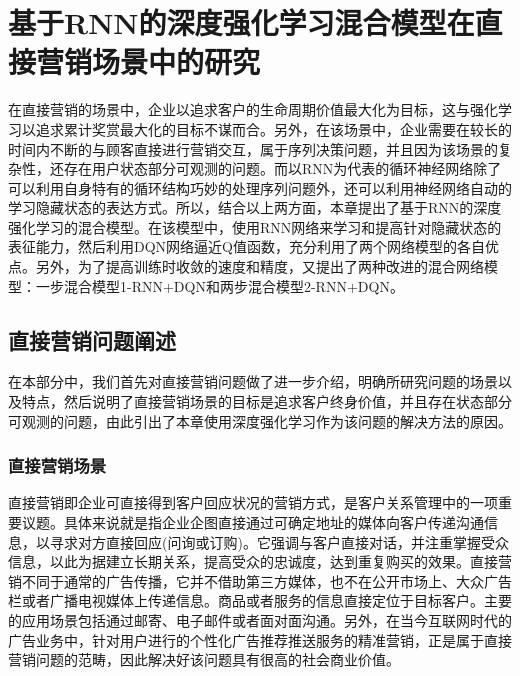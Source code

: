 \chapter{基于RNN的深度强化学习混合模型在直接营销场景中的研究}


在直接营销的场景中，企业以追求客户的生命周期价值最大化为目标，这与强化学习以追求累计奖赏最大化的目标不谋而合。另外，在该场景中，企业需要在较长的时间内不断的与顾客直接进行营销交互，属于序列决策问题，并且因为该场景的复杂性，还存在用户状态部分可观测的问题。而以RNN为代表的循环神经网络除了可以利用自身特有的循环结构巧妙的处理序列问题外，还可以利用神经网络自动的学习隐藏状态的表达方式。所以，结合以上两方面，本章提出了基于RNN的深度强化学习的混合模型。在该模型中，使用RNN网络来学习和提高针对隐藏状态的表征能力，然后利用DQN网络逼近Q值函数，充分利用了两个网络模型的各自优点。另外，为了提高训练时收敛的速度和精度，又提出了两种改进的混合网络模型：一步混合模型1-RNN+DQN和两步混合模型2-RNN+DQN。

\section{直接营销问题阐述}
在本部分中，我们首先对直接营销问题做了进一步介绍，明确所研究问题的场景以及特点，然后说明了直接营销场景的目标是追求客户终身价值，并且存在状态部分可观测的问题，由此引出了本章使用深度强化学习作为该问题的解决方法的原因。

\subsection{直接营销场景}
直接营销即企业可直接得到客户回应状况的营销方式，是客户关系管理中的一项重要议题。具体来说就是指企业企图直接通过可确定地址的媒体向客户传递沟通信息，以寻求对方直接回应(问询或订购)。它强调与客户直接对话，并注重掌握受众信息，以此为据建立长期关系，提高受众的忠诚度，达到重复购买的效果。直接营销不同于通常的广告传播，它并不借助第三方媒体，也不在公开市场上、大众广告栏或者广播电视媒体上传递信息。商品或者服务的信息直接定位于目标客户。主要的应用场景包括通过邮寄、电子邮件或者面对面沟通。另外，在当今互联网时代的广告业务中，针对用户进行的个性化广告推荐推送服务的精准营销，正是属于直接营销问题的范畴，因此解决好该问题具有很高的社会商业价值。

